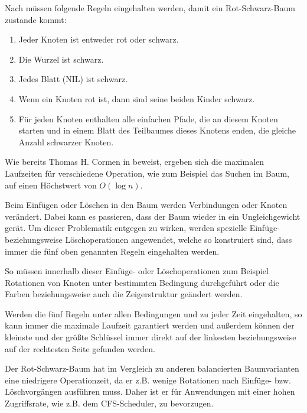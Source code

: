  
Nach \cite{tcormen} müssen folgende Regeln eingehalten werden, damit ein Rot-Schwarz-Baum zustande kommt:

\begin{enumerate}
	\item Jeder Knoten ist entweder rot oder schwarz.
	\item Die Wurzel ist schwarz.
	\item Jedes Blatt (NIL) ist schwarz.
	\item Wenn ein Knoten rot ist, dann sind seine beiden Kinder schwarz.
	\item Für jeden Knoten enthalten alle einfachen Pfade, die an diesem Knoten starten und in einem Blatt des Teilbaumes dieses Knotens enden, die gleiche Anzahl schwarzer Knoten. 
\end{enumerate}

Wie bereits Thomas H. Cormen in \cite{tcormen} beweist, ergeben sich die maximalen Laufzeiten für verschiedene Operation, wie zum Beispiel das Suchen im Baum, auf einen Höchstwert von $O(\log n)$. 

Beim Einfügen oder Löschen in den Baum werden Verbindungen oder Knoten verändert. Dabei kann es passieren, dass der Baum wieder in ein Ungleichgewicht gerät. 
Um dieser Problematik entgegen zu wirken, werden spezielle Einfüge- beziehungsweise Lösch\-operationen angewendet, welche so konstruiert sind, dass immer die fünf oben genannten Regeln eingehalten werden. 

So müssen innerhalb dieser Einfüge- oder Lösch\-ope\-ra\-ti\-on\-en zum Beispiel Rotationen von Knoten unter bestimmten Bedingung durchgeführt oder die Farben beziehungsweise auch die Zeigerstruktur geändert werden.

Werden die fünf Regeln unter allen Bedingungen und zu jeder Zeit eingehalten, so kann immer die maximale Laufzeit garantiert werden und außerdem können der kleinste und der größte Schlüssel immer direkt auf der linkesten beziehungsweise auf der rechtesten Seite gefunden werden.

Der Rot-Schwarz-Baum hat im Vergleich zu anderen balancierten Baumvarianten eine niedrigere Operationzeit, da er z.B. wenige Rotationen nach Einfüge- bzw. Lösch\-vorgängen ausführen muss.
Daher ist er für Anwendungen mit einer hohen Zugriffsrate, wie z.B. dem CFS-Scheduler, zu bevorzugen.


